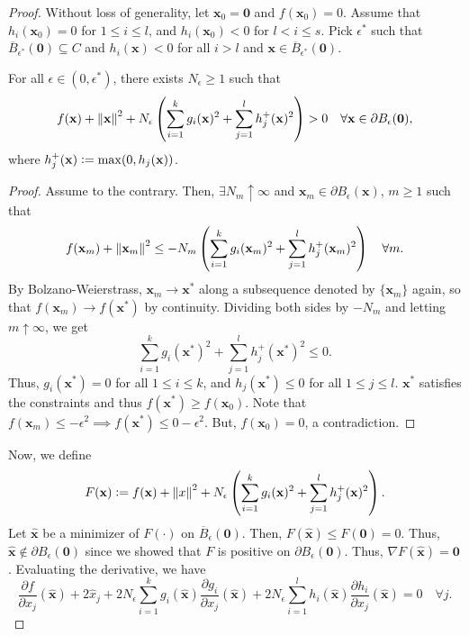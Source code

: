 \begin{proof}
    Without loss of generality, let $\mathbf{x}_0 = \mathbf{0}$ and $f(\mathbf{x}_0) = 0$. Assume that $h_i(\mathbf{x}_0) = 0$ for $1 \leq i \leq l$, and $h_i(\mathbf{x}_0) < 0$ for $l < i \leq s$. Pick $\epsilon^*$ such that $\overline{B}_{\epsilon^*}(\mathbf{0}) \subseteq C$ and $h_i(\mathbf{x}) < 0$ for all $i > l$ and $\mathbf{x} \in \overline{B}_{\epsilon^*}(\mathbf{0})$.

    \begin{lem}
        For all $\epsilon \in (0,\epsilon^*)$, there exists $N_{\epsilon} \geq 1$ such that
        \[
            f(\mathbf{x}) + \norm{\mathbf{x}}^2 + N_{\epsilon} \left( \sum_{i=1}^k g_i(\mathbf{x})^2 + \sum_{j=1}^l h_j^+(\mathbf{x})^2 \right) > 0 \quad \forall \mathbf{x} \in \partial B_{\epsilon}(\mathbf{0}),
        \]
        where $h_j^+(\mathbf{x}) \vcentcolon= \max(0, h_j(\mathbf{x}))$.
    \end{lem}  

    \begin{proof}
        Assume to the contrary. Then, $\exists N_m \uparrow \infty$ and $\mathbf{x}_m \in \partial B_{\epsilon}(\mathbf{x})$, $m \geq 1$ such that
        \[
            f(\mathbf{x}_m) + \norm{\mathbf{x}_m}^2 \leq -N_m \left( \sum_{i=1}^k g_i(\mathbf{x}_m)^2 + \sum_{j=1}^l h_j^+(\mathbf{x}_m)^2 \right) \quad \forall m.
        \]
        By Bolzano-Weierstrass, $\mathbf{x}_m \to \mathbf{x}^*$ along a subsequence denoted by $\{\mathbf{x}_m\}$ again, so that $f(\mathbf{x}_m) \to f(\mathbf{x}^*)$ by continuity. Dividing both sides by $-N_m$ and letting $m \uparrow \infty$, we get
        \[
            \sum_{i=1}^k g_i(\mathbf{x}^*)^2 + \sum_{j=1}^l h_j^+(\mathbf{x}^*)^2 \leq 0.
        \]
        Thus, $g_i(\mathbf{x}^*) = 0$ for all $1 \leq i \leq k$, and $h_j(\mathbf{x}^*) \leq 0$ for all $1 \leq j \leq l$. $\mathbf{x}^*$ satisfies the constraints and thus $f(\mathbf{x}^*) \geq f(\mathbf{x}_0)$. Note that $f(\mathbf{x}_m) \leq -\epsilon^2 \implies f(\mathbf{x}^*) \leq 0-\epsilon^2$. But, $f(\mathbf{x}_0) = 0$, a contradiction.
    \end{proof}

    Now, we define
    \[
        F(\mathbf{x}) \vcentcolon= f(\mathbf{x}) + \norm{x}^2 + N_{\epsilon} \left( \sum_{i=1}^k g_i(\mathbf{x})^2 + \sum_{j=1}^l h_j^+(\mathbf{x})^2 \right).
    \]
    Let $\hat{\mathbf{x}}$ be a minimizer of $F(\cdot)$ on $\overline{B}_{\epsilon}(\mathbf{0})$. Then, $F(\hat{\mathbf{x}}) \leq F(\mathbf{0}) = 0$. Thus, $\hat{\mathbf{x}} \notin \partial B_{\epsilon}(\mathbf{0})$ since we showed that $F$ is positive on $\partial B_{\epsilon}(\mathbf{0})$. Thus, $\nabla F(\hat{\mathbf{x}}) = \mathbf{0}$. Evaluating the derivative, we have
    \[
        \frac{\partial f}{\partial x_j}(\hat{\mathbf{x}}) + 2\hat{x}_j + 2N_{\epsilon} \sum_{i=1}^k g_i(\hat{\mathbf{x}}) \frac{\partial g_i}{\partial x_j}(\hat{\mathbf{x}}) + 2N_{\epsilon} \sum_{i=1}^l h_i(\hat{\mathbf{x}}) \frac{\partial h_i}{\partial x_j}(\hat{\mathbf{x}}) = 0 \quad \forall j.
    \]


\end{proof}
